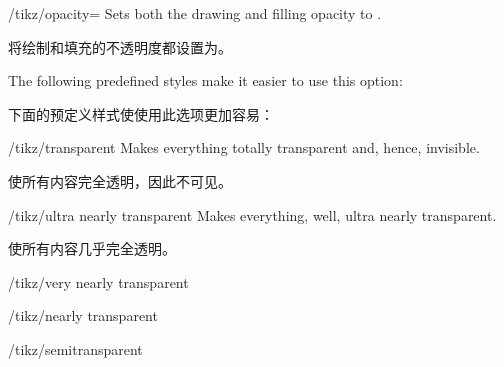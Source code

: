\begin{key}{/tikz/opacity=}
    Sets both the drawing and filling opacity to .

    将绘制和填充的不透明度都设置为。

    The following predefined styles make it easier to use this option:

    下面的预定义样式使使用此选项更加容易：
    \begin{stylekey}{/tikz/transparent}
        Makes everything totally transparent and, hence, invisible.
        
        使所有内容完全透明，因此不可见。


\begin{codeexample}[]
\end{codeexample}
    \end{stylekey}

    \begin{stylekey}{/tikz/ultra nearly transparent}
        Makes everything, well, ultra nearly transparent.
        
        使所有内容几乎完全透明。
\begin{codeexample}[]
\end{codeexample}
    \end{stylekey}

    \begin{stylekey}{/tikz/very nearly transparent}
\begin{codeexample}[]
\end{codeexample}
    \end{stylekey}

    \begin{stylekey}{/tikz/nearly transparent}
\begin{codeexample}[]
\end{codeexample}
    \end{stylekey}

    \begin{stylekey}{/tikz/semitransparent}
\begin{codeexample}[]
\end{codeexample}
    \end{stylekey}


\end{key}
